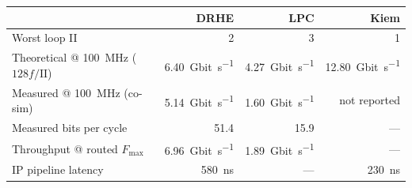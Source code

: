 \documentclass[10pt,a4paper]{article}
\begin{document}


\begin{center}
\begin{minipage}{0.98\textwidth}\centering
{}
\centering\small
\begin{tabular}{@{}lrrr@{}}
\toprule
& DRHE & LPC & Kiem\\
\midrule
Worst loop II                       & 2 & 3 & 1\\
Theoretical @ \SI{100}{\mega\hertz} ($128f/\mathrm{II}$) & \SI{6.40}{Gbit\per\second} & \SI{4.27}{Gbit\per\second} & \SI{12.80}{Gbit\per\second}\\
Measured @ \SI{100}{\mega\hertz} (co-sim) & \SI{5.14}{Gbit\per\second} & \SI{1.60}{Gbit\per\second} & not reported\\
Measured bits per cycle             & 51.4 & 15.9 & ---\\
Throughput @ routed $F_{\max}$      & \SI{6.96}{Gbit\per\second} & \SI{1.89}{Gbit\per\second} & ---\\
IP pipeline latency                 & \SI{580}{\nano\second} & --- & \SI{230}{\nano\second}\\
\bottomrule
\end{tabular}
\end{minipage}
\end{center}
\end{document}
